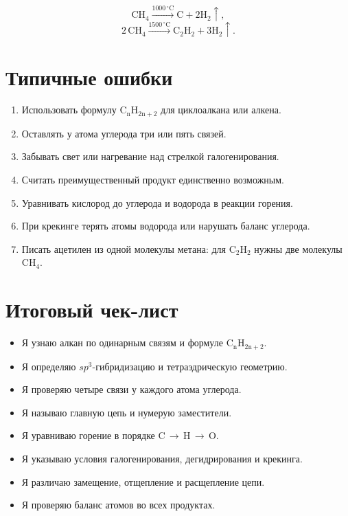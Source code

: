 \documentclass[a4paper,12pt]{article}
\newcommand{\chem}[1]{\ensuremath{\mathrm{#1}}}
\begin{document}
\[
\chem{CH_4}\xrightarrow{1000\,{}^\circ\mathrm{C}}\chem{C+2H_2}\!\uparrow,
\]
\[
2\,\chem{CH_4}\xrightarrow{1500\,{}^\circ\mathrm{C}}\chem{C_2H_2+3H_2}\!\uparrow.
\]

\section{Типичные ошибки}

\begin{enumerate}[itemsep=1pt]
  \item Использовать формулу \chem{C_{n}H_{2n+2}} для циклоалкана или алкена.
  \item Оставлять у атома углерода три или пять связей.
  \item Забывать свет или нагревание над стрелкой галогенирования.
  \item Считать преимущественный продукт единственно возможным.
  \item Уравнивать кислород до углерода и водорода в реакции горения.
  \item При крекинге терять атомы водорода или нарушать баланс углерода.
  \item Писать ацетилен из одной молекулы метана: для \chem{C_2H_2} нужны две молекулы \chem{CH_4}.
\end{enumerate}

\section{Итоговый чек-лист}

\begin{itemize}[label=$\square$,itemsep=1pt]
  \item Я узнаю алкан по одинарным связям и формуле \chem{C_{n}H_{2n+2}}.
  \item Я определяю $sp^3$-гибридизацию и тетраэдрическую геометрию.
  \item Я проверяю четыре связи у каждого атома углерода.
  \item Я называю главную цепь и нумерую заместители.
  \item Я уравниваю горение в порядке \chem{C}\,$\rightarrow$\,\chem{H}\,$\rightarrow$\,\chem{O}.
  \item Я указываю условия галогенирования, дегидрирования и крекинга.
  \item Я различаю замещение, отщепление и расщепление цепи.
  \item Я проверяю баланс атомов во всех продуктах.
\end{itemize}
\end{document}
